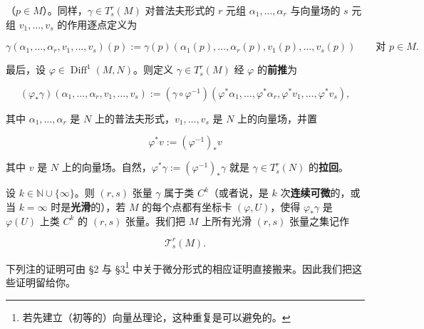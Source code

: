 （$ p \in M $）。同样，$ \gamma \in T_{s}^{r}(M) $ 对普法夫形式的 $ r $ 元组 $ \alpha_1, \ldots, \alpha_r $ 与向量场的 $ s $ 元组 $ v_1, \ldots, v_s $ 的作用逐点定义为

\[
\gamma(\alpha_1, \ldots, \alpha_r, v_1, \ldots, v_s)(p) := \gamma(p)(\alpha_1(p), \ldots, \alpha_r(p), v_1(p), \ldots, v_s(p)) \qquad \text{对 } p \in M .
\]

最后，设 $ \varphi \in \operatorname{Diff}^{1}(M,N) $。则定义 $ \gamma \in T_{s}^{r}(M) $ 经 $ \varphi $ 的\textbf{前推}为

\[
(\varphi_{\ast}\gamma)(\alpha_1, \ldots, \alpha_r, v_1, \ldots, v_s) := (\gamma \circ \varphi^{-1})(\varphi^{\ast}\alpha_1, \ldots, \varphi^{\ast}\alpha_r, \varphi^{\ast}v_1, \ldots, \varphi^{\ast}v_s) ,
\]

其中 $ \alpha_1, \ldots, \alpha_r $ 是 $ N $ 上的普法夫形式，$ v_1, \ldots, v_s $ 是 $ N $ 上的向量场，并置

\begin{equation}
\varphi^{\ast}v := (\varphi^{-1})_{\ast}v\tag{4.25}
\end{equation}

其中 $ v $ 是 $ N $ 上的向量场。自然，$ \varphi^{\ast}\gamma := (\varphi^{-1})_{\ast}\gamma $ 就是 $ \gamma \in T_{s}^{r}(N) $ 的\textbf{拉回}。

设 $ k \in \mathbb{N} \cup \{ \infty \} $。则 $ (r,s) $ 张量 $ \gamma $ 属于类 $ C^{k} $（或者说，是 $ k $ 次\textbf{连续可微}的，或当 $ k = \infty $ 时是\textbf{光滑}的），若 $ M $ 的每个点都有坐标卡 $ (\varphi, U) $，使得 $ \varphi_{\ast}\gamma $ 是 $ \varphi(U) $ 上类 $ C^{k} $ 的 $ (r,s) $ 张量。我们把 $ M $ 上所有光滑 $ (r,s) $ 张量之集记作

\[
\mathcal{T}_{s}^{r}(M) .
\]

下列注的证明可由 §2 与 §3\footnote{若先建立（初等的）向量丛理论，这种重复是可以避免的。} 中关于微分形式的相应证明直接搬来。因此我们把这些证明留给你。

